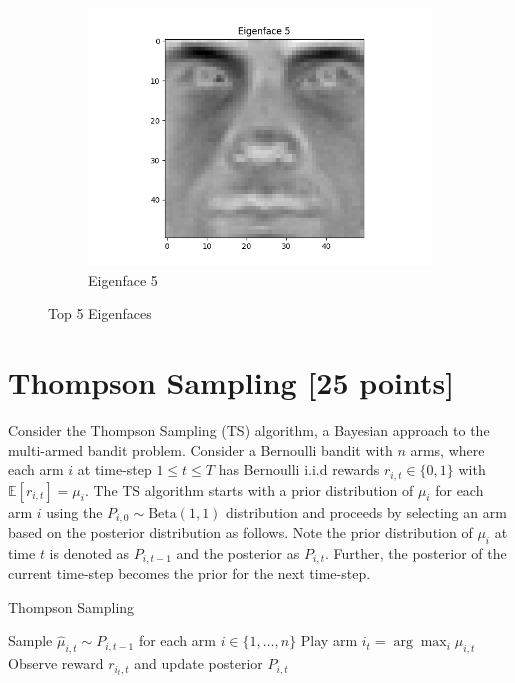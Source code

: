 \documentclass{article}
\begin{document}
\begin{enumerate}[label=(\alph*)]
\begin{figure}[H]
\begin{subfigure}{0.4\textwidth}
            \includegraphics[width=\textwidth]{eigen5.png}
            \caption{Eigenface 5}
        \end{subfigure}
        \caption*{Top 5 Eigenfaces}
        \label{fig:eigenfaces}
    \end{figure}
\end{enumerate}


\clearpage

\section{Thompson Sampling [25 points]}

Consider the Thompson Sampling (TS) algorithm, a Bayesian approach to the multi-armed bandit problem. Consider a Bernoulli bandit with $n$ arms, where each arm $i$ at time-step $1 \leq t \leq T$ has Bernoulli i.i.d rewards $r_{i,t} \in \{0, 1\}$ with $\mathbb{E}[r_{i,t}] = \mu_i$. The TS algorithm starts with a prior distribution of $\mu_i$ for each arm $i$ using the $P_{i,0} \sim \text{Beta}(1, 1)$ distribution and proceeds by selecting an arm based on the posterior distribution as follows. Note the prior distribution of $\mu_i$ at time $t$ is denoted as $P_{i,t-1}$ and the posterior as $P_{i,t}$. Further, the posterior of the current time-step becomes the prior for the next time-step.

\begin{algorithm}[H]
\caption{Thompson Sampling}
\begin{algorithmic}[1]
    \State Sample $\hat{\mu}_{i,t} \sim P_{i,t-1}$ for each arm $i \in \{1, \ldots, n\}$
    \State Play arm $i_t = \arg \max_i \hat{\mu}_{i,t}$
    \State Observe reward $r_{i_t,t}$ and update posterior $P_{i,t}$
\EndFor
\end{algorithmic}
\end{algorithm}
\end{document}
